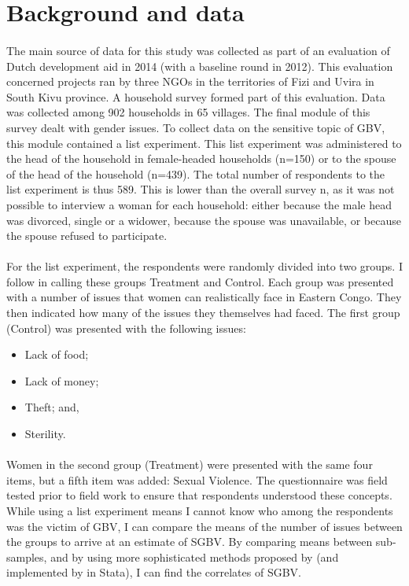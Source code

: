 \documentclass[11pt,a4paper]{scrartcl} %
\begin{document}
\section*{Background and data}
\paragraph{}
The main source of data for this study was collected as part of an evaluation of Dutch development aid in 2014 (with a baseline round in 2012). This evaluation concerned projects ran by three NGOs in the territories of Fizi and Uvira in South Kivu province. A household survey formed part of this evaluation. Data was collected among 902 households in 65 villages. The final module of this survey dealt with gender issues. To collect data on the sensitive topic of GBV, this module contained a list experiment. This list experiment was administered to the head of the household in female-headed households (n=150) or to the spouse of the head of the household (n=439). The total number of respondents to the list experiment is thus 589. This is lower than the overall survey n, as it was not possible to interview a woman for each household: either because the male head was divorced, single or a widower, because the spouse was unavailable, or because the spouse refused to participate.

\paragraph{}
For the list experiment, the respondents were randomly divided into two groups. I follow \cite{Imai2011} in calling these groups Treatment and Control. Each group was presented with a number of issues that women can realistically face in Eastern Congo. They then indicated how many of the issues they themselves had faced. The first group (Control) was presented with the following issues:
\begin{itemize}
	\item Lack of food;
	\item Lack of money;
	\item Theft; and,
	\item Sterility.
\end{itemize}

\paragraph{}
 Women in the second group (Treatment) were presented with the same four items, but a fifth item was added: Sexual Violence. The questionnaire was field tested prior to field work to ensure that respondents understood these concepts. While using a list experiment means I cannot know who among the respondents was the victim of GBV, I can compare the means of the number of issues between the groups to arrive at an estimate of SGBV. By comparing means between sub-samples, and by using more sophisticated methods proposed by \citet{Imai2011} (and implemented by \cite{Tsai2019} in Stata), I can find the correlates of SGBV. 
\end{document}
